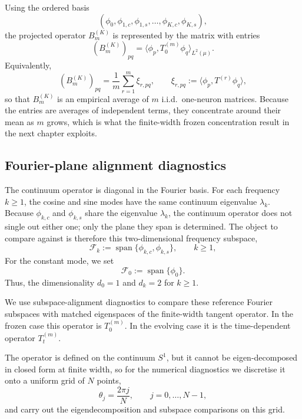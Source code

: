 Using the ordered basis
\[
	(\phi_0,\phi_{1,c},\phi_{1,s},\dots,\phi_{K,c},\phi_{K,s}),
\]
the projected operator \(B_m^{(K)}\) is represented by the matrix with entries
\begin{equation}
	(B_m^{(K)})_{pq}
	=
	\langle \phi_p,T_0^{(m)}\phi_q\rangle_{L^2(\mu)}.
	\label{eq:method-finite-width-block-entry}
\end{equation}
Equivalently,
\begin{equation}
	(B_m^{(K)})_{pq}
	=
	\frac1m\sum_{r=1}^m \xi_{r,pq},
	\qquad
	\xi_{r,pq}:=\langle \phi_p,T^{(r)}\phi_q\rangle,
	\label{eq:method-finite-width-entry-average}
\end{equation}
so that \(B_m^{(K)}\) is an empirical average of \(m\) i.i.d.\ one-neuron
matrices. Because the entries are averages of independent terms, they concentrate
around their mean as \(m\) grows, which is what the finite-width frozen
concentration result in the next chapter exploits.

\subsection{Fourier-plane alignment diagnostics}
\label{subsec:method-projector-error}

The continuum operator is diagonal in the Fourier basis. For each frequency
\(k\ge 1\), the cosine and sine modes have the same continuum eigenvalue
\(\lambda_k\). Because \(\phi_{k,c}\) and \(\phi_{k,s}\) share the eigenvalue
\(\lambda_k\), the continuum operator does not single out either one; only the
plane they span is determined. The object to compare against is therefore this
two-dimensional frequency subspace,
\[
	\mathcal F_k
	:=
	\operatorname{span}\{\phi_{k,c},\phi_{k,s}\},
	\qquad k\ge 1,
\]
For the constant mode, we set
\[
	\mathcal F_0:=\operatorname{span}\{\phi_0\}.
\]
Thus, the dimensionality \(d_0=1\) and \(d_k=2\) for \(k\ge 1\).

We use subspace-alignment diagnostics to compare these reference Fourier
subspaces with matched eigenspaces of the finite-width tangent operator. In the
frozen case this operator is \(T_0^{(m)}\). In the evolving case it is the
time-dependent operator \(T_t^{(m)}\).

The operator is defined on the continuum \(S^1\), but it cannot be eigen-decomposed
in closed form at finite width, so for the numerical diagnostics we discretise it
onto a uniform grid of \(N\) points,
\[
	\theta_j=\frac{2\pi j}{N},\qquad j=0,\dots,N-1,
\]
and carry out the eigendecomposition and subspace comparisons on this grid.


